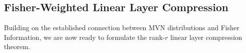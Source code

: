 \documentclass{article}
\begin{document}
\subsection{Fisher-Weighted Linear Layer Compression}
\label{sec:fisher_compress}
Building on the established connection between MVN distributions and Fisher Information, we are now ready to formulate the rank-$r$ linear layer compression theorem.
\end{document}
